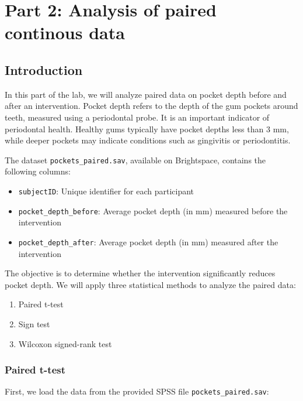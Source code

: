 \documentclass[
  letterpaper,
  DIV=11,
  numbers=noendperiod]{scrartcl}
\providecommand{\tightlist}{%
  \setlength{\itemsep}{0pt}\setlength{\parskip}{0pt}}\usepackage{longtable,booktabs,array}
\begin{document}
\section{Part 2: Analysis of paired continous
data}\label{part-2-analysis-of-paired-continous-data}

\subsection{Introduction}\label{introduction}

In this part of the lab, we will analyze paired data on pocket depth
before and after an intervention. Pocket depth refers to the depth of
the gum pockets around teeth, measured using a periodontal probe. It is
an important indicator of periodontal health. Healthy gums typically
have pocket depths less than 3 mm, while deeper pockets may indicate
conditions such as gingivitis or periodontitis.

The dataset \texttt{pockets\_paired.sav}, available on Brightspace,
contains the following columns:

\begin{itemize}
\tightlist
\item
  \texttt{subjectID}: Unique identifier for each participant
\item
  \texttt{pocket\_depth\_before}: Average pocket depth (in mm) measured
  before the intervention
\item
  \texttt{pocket\_depth\_after}: Average pocket depth (in mm) measured
  after the intervention
\end{itemize}

The objective is to determine whether the intervention significantly
reduces pocket depth. We will apply three statistical methods to analyze
the paired data:

\begin{enumerate}
\def\labelenumi{\arabic{enumi}.}
\tightlist
\item
  Paired t-test
\item
  Sign test
\item
  Wilcoxon signed-rank test
\end{enumerate}

\subsubsection{Paired t-test}\label{paired-t-test}

First, we load the data from the provided SPSS file
\texttt{pockets\_paired.sav}:
\end{document}
